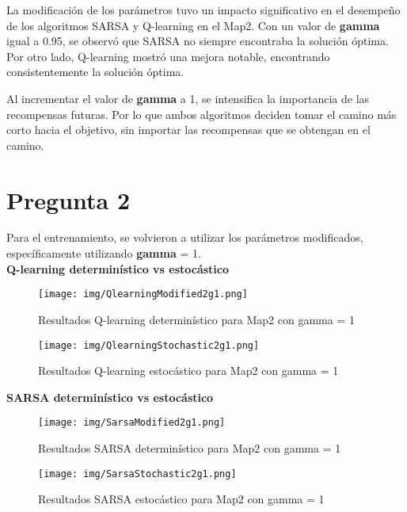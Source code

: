 \documentclass[
	spanish, %
	oneside
]{article}
\begin{document}
\noindent La modificación de los parámetros tuvo un impacto significativo en el desempeño de los algoritmos SARSA y Q-learning en el Map2. Con un valor de \textbf{gamma} igual a 0.95, se observó que SARSA no siempre encontraba la solución óptima. Por otro lado, Q-learning mostró una mejora notable, encontrando consistentemente la solución óptima.

\vspace*{12pt}
\noindent Al incrementar el valor de \textbf{gamma} a 1, se intensifica la importancia de las recompensas futuras. Por lo que ambos algoritmos deciden tomar el camino más corto hacia el objetivo, sin importar las recompensas que se obtengan en el camino. \\

\newpage

\section*{Pregunta 2}

Para el entrenamiento, se volvieron a utilizar los parámetros modificados, específicamente utilizando \textbf{gamma} = 1. \\

\indent\textbf{Q-learning determinístico vs estocástico}

\begin{figure}[H]
	\centering
	\texttt{[image: img/QlearningModified2g1.png]}
	\caption{Resultados Q-learning determinístico para Map2 con gamma = 1}
	\label{fig:map2_qlearning_modified22}
\end{figure}

\begin{figure}[H]
	\centering
	\texttt{[image: img/QlearningStochastic2g1.png]}
	\caption{Resultados Q-learning estocástico para Map2 con gamma = 1}
	\label{fig:map2_qlearning_stochastic}
\end{figure}


\indent\textbf{SARSA determinístico vs estocástico}

\begin{figure}[H]
	\centering
	\texttt{[image: img/SarsaModified2g1.png]}
	\caption{Resultados SARSA determinístico para Map2 con gamma = 1}
	\label{fig:map2_sarsa_modified22}
\end{figure}

\begin{figure}[H]
	\centering
	\texttt{[image: img/SarsaStochastic2g1.png]}
	\caption{Resultados SARSA estocástico para Map2 con gamma = 1}
	\label{fig:map2_sarsa_stochastic}
\end{figure}
\end{document}
